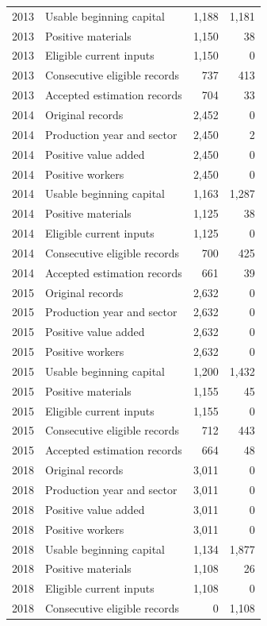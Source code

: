 \begin{longtable}{llrr}
2013 & Usable beginning capital & 1,188 & 1,181 \\
2013 & Positive materials & 1,150 & 38 \\
2013 & Eligible current inputs & 1,150 & 0 \\
2013 & Consecutive eligible records & 737 & 413 \\
2013 & Accepted estimation records & 704 & 33 \\
2014 & Original records & 2,452 & 0 \\
2014 & Production year and sector & 2,450 & 2 \\
2014 & Positive value added & 2,450 & 0 \\
2014 & Positive workers & 2,450 & 0 \\
2014 & Usable beginning capital & 1,163 & 1,287 \\
2014 & Positive materials & 1,125 & 38 \\
2014 & Eligible current inputs & 1,125 & 0 \\
2014 & Consecutive eligible records & 700 & 425 \\
2014 & Accepted estimation records & 661 & 39 \\
2015 & Original records & 2,632 & 0 \\
2015 & Production year and sector & 2,632 & 0 \\
2015 & Positive value added & 2,632 & 0 \\
2015 & Positive workers & 2,632 & 0 \\
2015 & Usable beginning capital & 1,200 & 1,432 \\
2015 & Positive materials & 1,155 & 45 \\
2015 & Eligible current inputs & 1,155 & 0 \\
2015 & Consecutive eligible records & 712 & 443 \\
2015 & Accepted estimation records & 664 & 48 \\
2018 & Original records & 3,011 & 0 \\
2018 & Production year and sector & 3,011 & 0 \\
2018 & Positive value added & 3,011 & 0 \\
2018 & Positive workers & 3,011 & 0 \\
2018 & Usable beginning capital & 1,134 & 1,877 \\
2018 & Positive materials & 1,108 & 26 \\
2018 & Eligible current inputs & 1,108 & 0 \\
2018 & Consecutive eligible records & 0 & 1,108 \\

\end{longtable}
